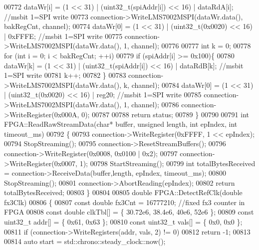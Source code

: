 \begin{DoxyCode}
{{{{{00772         dataWr[i] = (1 << 31) | (uint32\_t(spiAddr[i]) << 16) | dataRdA[i]; \textcolor{comment}{//msbit 1=SPI write}
00773     connection->WriteLMS7002MSPI(dataWr.data(), bakRegCnt, channel);
00774     dataWr[0] = (1 << 31) | (uint32\_t(0x0020) << 16) | 0xFFFE; \textcolor{comment}{//msbit 1=SPI write}
00775     connection->WriteLMS7002MSPI(dataWr.data(), 1, channel);
00776 
00777     \textcolor{keywordtype}{int} k = 0;
00778     \textcolor{keywordflow}{for} (\textcolor{keywordtype}{int} i = 0; i < bakRegCnt; ++i)
00779         \textcolor{keywordflow}{if} (spiAddr[i] >= 0x100)\{
00780             dataWr[k] = (1 << 31) | (uint32\_t(spiAddr[i]) << 16) | dataRdB[k]; \textcolor{comment}{//msbit 1=SPI write}
00781             k++;
00782         \}
00783     connection->WriteLMS7002MSPI(dataWr.data(), k, channel);
00784     dataWr[0] = (1 << 31) | (uint32\_t(0x0020) << 16) | reg20; \textcolor{comment}{//msbit 1=SPI write}
00785     connection->WriteLMS7002MSPI(dataWr.data(), 1, channel);
00786     connection->WriteRegister(0x000A, 0);
00787 
00788     \textcolor{keywordflow}{return} status;
00789 \}
00790 
00791 \textcolor{keywordtype}{int} FPGA::ReadRawStreamData(\textcolor{keywordtype}{char}* buffer, \textcolor{keywordtype}{unsigned} length, \textcolor{keywordtype}{int} epIndex, \textcolor{keywordtype}{int} 
      timeout_ms)
00792 \{
00793     connection->WriteRegister(0xFFFF, 1 << epIndex);
00794     StopStreaming();
00795     connection->ResetStreamBuffers();
00796     connection->WriteRegister(0x0008, 0x0100 | 0x2);
00797     connection->WriteRegister(0x0007, 1);
00798     StartStreaming();
00799     \textcolor{keywordtype}{int} totalBytesReceived = connection->ReceiveData(buffer,length, epIndex, timeout\_ms);
00800     StopStreaming();
00801     connection->AbortReading(epIndex);
00802     \textcolor{keywordflow}{return} totalBytesReceived;
00803 \}
00804 
00805 \textcolor{keywordtype}{double} FPGA::DetectRefClk(\textcolor{keywordtype}{double} fx3Clk)
00806 \{
00807     \textcolor{keyword}{const} \textcolor{keywordtype}{double} fx3Cnt = 16777210;         \textcolor{comment}{//fixed fx3 counter in FPGA}
00808     \textcolor{keyword}{const} \textcolor{keywordtype}{double} clkTbl[] = \{ 30.72e6, 38.4e6, 40e6, 52e6 \};
00809     \textcolor{keyword}{const} uint32\_t addr[] = \{ 0x61, 0x63 \};
00810     \textcolor{keyword}{const} uint32\_t vals[] = \{ 0x0, 0x0 \};
00811     \textcolor{keywordflow}{if} (connection->WriteRegisters(addr, vals, 2) != 0)
00812         \textcolor{keywordflow}{return} -1;
00813 
00814     \textcolor{keyword}{auto} start = std::chrono::steady\_clock::now();
}}}}}
\end{DoxyCode}

